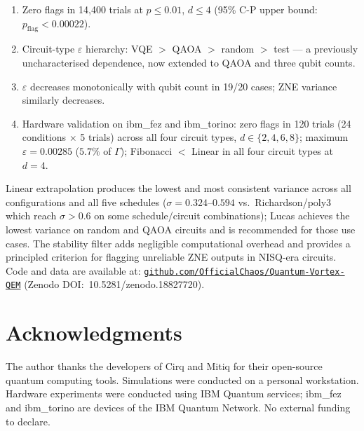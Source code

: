 \documentclass[10pt,letterpaper]{article}
\begin{document}
\begin{enumerate}\setlength{\itemsep}{1pt}
  \item Zero flags in 14,400 trials at $p\leq 0.01$, $d\leq 4$
    (95\% C-P upper bound: $p_{\mathrm{flag}}<0.00022$).
  \item Circuit-type $\varepsilon$ hierarchy:
    VQE $>$ QAOA $>$ random $>$ test --- a previously uncharacterised
    dependence, now extended to QAOA and three qubit counts.
  \item $\varepsilon$ decreases monotonically with qubit count in
    19/20 cases; ZNE variance similarly decreases.
  \item Hardware validation on ibm\_fez and ibm\_torino: zero flags
    in 120 trials (24 conditions $\times$ 5 trials) across all four
    circuit types, $d\in\{2,4,6,8\}$; maximum $\varepsilon=0.00285$
    ($5.7\%$ of $\Gamma$); Fibonacci $<$ Linear in all four circuit
    types at $d=4$.
\end{enumerate}

Linear extrapolation produces the lowest and most consistent variance
across all configurations and all five schedules ($\sigma=0.324$--$0.594$
vs.\ Richardson/poly3 which reach $\sigma>0.6$ on some schedule/circuit
combinations); Lucas achieves the lowest variance on random and QAOA
circuits and is recommended for those use cases.
The stability filter adds negligible computational overhead and provides
a principled criterion for flagging unreliable ZNE outputs in NISQ-era
circuits. Code and data are available at:
\href{https://github.com/OfficialChaos/Quantum-Vortex-QEM}{\texttt{github.com/OfficialChaos/Quantum-Vortex-QEM}}
(Zenodo DOI:~10.5281/zenodo.18827720).

\section*{Acknowledgments}

The author thanks the developers of Cirq and Mitiq for their
open-source quantum computing tools. Simulations were conducted on
a personal workstation. Hardware experiments were conducted using
IBM Quantum services; ibm\_fez and ibm\_torino are devices of the
IBM Quantum Network. No external funding to declare.
\end{document}
